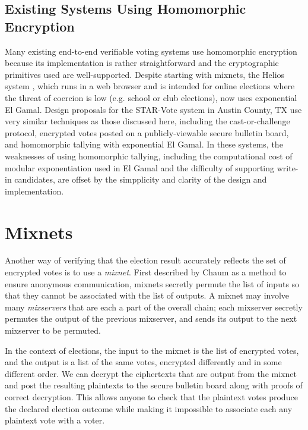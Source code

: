 \subsection{Existing Systems Using Homomorphic Encryption} \label{evote:homomorphic:existing}

Many existing end-to-end verifiable voting systems use homomorphic encryption because its implementation is rather straightforward and the cryptographic primitives used are well-supported. Despite starting with mixnets, the Helios system \cite{adida-helios}, which runs in a web browser and is intended for online elections where the threat of coercion is low (e.g. school or club elections), now uses exponential El Gamal. Design proposals for the STAR-Vote system in Austin County, TX \cite{starvote} use very similar techniques as those discussed here, including the cast-or-challenge protocol, encrypted votes posted on a publicly-viewable secure bulletin board, and homomorphic tallying with exponential El Gamal. In these systems, the weaknesses of using homomorphic tallying, including the computational cost of modular exponentiation used in El Gamal and the difficulty of supporting write-in candidates, are offset by the simpplicity and clarity of the design and implementation.

\section{Mixnets} \label{evote:mixnets}

Another way of verifying that the election result accurately reflects the set of encrypted votes is to use a \emph{mixnet}. First described by Chaum \cite{chaum81} as a method to ensure anonymous communication, mixnets secretly permute the list of inputs so that they cannot be associated with the list of outputs. A mixnet may involve many \emph{mixservers} that are each a part of the overall chain; each mixserver secretly permutes the output of the previous mixserver, and sends its output to the next mixserver to be permuted.

In the context of elections, the input to the mixnet is the list of encrypted votes, and the output is a list of the same votes, encrypted differently and in some different order. We can decrypt the ciphertexts that are output from the mixnet and post the resulting plaintexts to the secure bulletin board along with proofs of correct decryption. This allows anyone to check that the plaintext votes produce the declared election outcome while making it impossible to associate each any plaintext vote with a voter.

